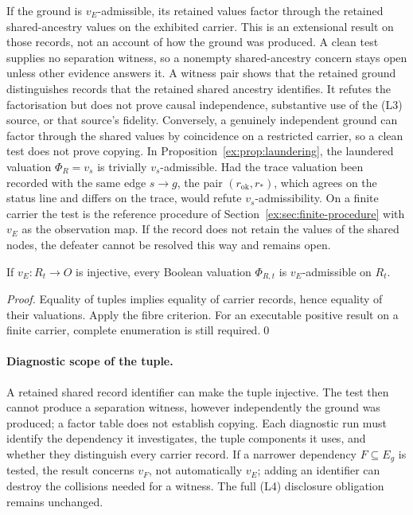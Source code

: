\documentclass[twocolumn,envcountsect,envcountsame,natbib]{svjour3}
\begin{document}
If the ground is $v_E$-admissible, its retained values factor through the retained shared-ancestry values on the exhibited carrier. This is an extensional result on those records, not an account of how the ground was produced. A clean test supplies no separation witness, so a nonempty shared-ancestry concern stays open unless other evidence answers it. A witness pair shows that the retained ground distinguishes records that the retained shared ancestry identifies. It refutes the factorisation but does not prove causal independence, substantive use of the (L3) source, or that source's fidelity. Conversely, a genuinely independent ground can factor through the shared values by coincidence on a restricted carrier, so a clean test does not prove copying. In Proposition~\ref{ex:prop:laundering}, the laundered valuation $\Phi_R=v_s$ is trivially $v_s$-admissible. Had the trace valuation been recorded with the same edge $s\to g$, the pair $(r_{\mathrm{ok}},r_*)$, which agrees on the status line and differs on the trace, would refute $v_s$-admissibility. On a finite carrier the test is the reference procedure of Section~\ref{ex:sec:finite-procedure} with $v_E$ as the observation map. If the record does not retain the values of the shared nodes, the defeater cannot be resolved this way and remains open.

\begin{proposition}\label{ex:prop:injective-tuple}
If $v_E:R_t\to O$ is injective, every Boolean valuation $\Phi_{R,t}$ is $v_E$-admissible on $R_t$.
\end{proposition}
\begin{proof}
Equality of tuples implies equality of carrier records, hence equality of their valuations. Apply the fibre criterion. For an executable positive result on a finite carrier, complete enumeration is still required.\qed
\end{proof}

\paragraph{Diagnostic scope of the tuple.} A retained shared record identifier can make the tuple injective. The test then cannot produce a separation witness, however independently the ground was produced; a factor table does not establish copying. Each diagnostic run must identify the dependency it investigates, the tuple components it uses, and whether they distinguish every carrier record. If a narrower dependency $F\subseteq E_g$ is tested, the result concerns $v_F$, not automatically $v_E$; adding an identifier can destroy the collisions needed for a witness. The full (L4) disclosure obligation remains unchanged.
\end{document}
